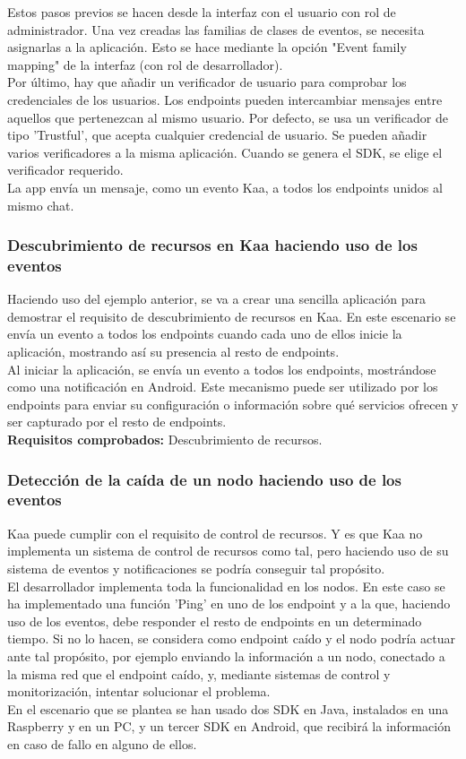 \documentclass[12pt, twoside]{book}
\begin{document}
Estos pasos previos se hacen desde la interfaz con el usuario con rol de administrador. Una vez creadas las familias de clases de eventos, se necesita asignarlas a la aplicación. Esto se hace mediante la opción "Event family mapping" de la interfaz (con rol de desarrollador). \\
Por último, hay que añadir 	un verificador de usuario para comprobar los credenciales de los usuarios. Los endpoints pueden intercambiar mensajes entre aquellos que pertenezcan al mismo usuario. Por defecto, se usa un verificador de tipo 'Trustful', que acepta cualquier credencial de usuario. Se pueden añadir varios verificadores a la misma aplicación. Cuando se genera el SDK, se elige el verificador requerido. \\
La app envía un mensaje, como un evento Kaa, a todos los endpoints unidos al mismo chat.


\subsubsection*{Descubrimiento de recursos en Kaa haciendo uso de los eventos}
Haciendo uso del ejemplo anterior, se va a crear una sencilla aplicación para demostrar el requisito de descubrimiento de recursos en Kaa. En este escenario se envía un evento a todos los endpoints cuando cada uno de ellos inicie la aplicación, mostrando así su presencia al resto de endpoints.\\
Al iniciar la aplicación, se envía un evento a todos los endpoints, mostrándose como una notificación en Android. Este mecanismo puede ser utilizado por los endpoints para enviar su configuración o información sobre qué servicios ofrecen y ser capturado por el resto de endpoints.\\
\textbf{Requisitos comprobados: } Descubrimiento de recursos.

\subsubsection*{Detección de la caída de un nodo haciendo uso de los eventos}
Kaa puede cumplir con el requisito de control de recursos. Y es que Kaa  no implementa un sistema de control de recursos como tal, pero haciendo uso de su sistema de eventos y notificaciones se podría conseguir tal propósito.\\
El desarrollador implementa toda la funcionalidad en los nodos. En este caso se ha implementado una función 'Ping' en uno de los endpoint y a la que, haciendo uso de los eventos, debe responder el resto de endpoints en un determinado tiempo. Si no lo hacen, se considera como endpoint caído y el nodo podría actuar ante tal propósito, por ejemplo enviando la información a un nodo, conectado a la misma red que el endpoint caído, y, mediante sistemas de control y monitorización, intentar solucionar el problema. \\
En el escenario que se plantea se han usado dos SDK en Java, instalados en una Raspberry y en un PC, y un tercer SDK en Android, que recibirá la información en caso de fallo en alguno de ellos.\\
\end{document}
